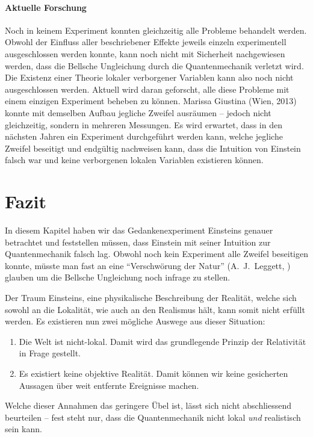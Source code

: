 \begin{refsection}
\paragraph{Aktuelle Forschung}
Noch in keinem Experiment konnten gleichzeitig alle Probleme behandelt werden.
Obwohl der Einfluss aller beschriebener Effekte jeweils einzeln experimentell
ausgeschlossen werden konnte, kann noch nicht mit Sicherheit nachgewiesen
werden, dass die Bellsche Ungleichung durch die Quantenmechanik verletzt wird.
Die Existenz einer Theorie lokaler verborgener Variablen kann also noch nicht
ausgeschlossen werden. 
Aktuell wird daran geforscht, alle diese Probleme mit einem einzigen Experiment
beheben zu k\"onnen. 
Marissa Giustina (Wien, 2013) \cite{Bell:Giustina2013} konnte mit demselben 
Aufbau jegliche Zweifel ausr\"aumen -- jedoch nicht gleichzeitig, sondern in 
mehreren Messungen.
Es wird erwartet, dass in den n\"achsten Jahren ein Experiment durchgef\"uhrt
werden kann, welche jegliche Zweifel beseitigt und endg\"ultig nachweisen
kann, dass die Intuition von Einstein falsch war und keine verborgenen
lokalen Variablen existieren k\"onnen.

\section{Fazit}
In diesem Kapitel haben wir das Gedankenexperiment Einsteins genauer betrachtet
und feststellen m\"ussen, dass Einstein mit seiner Intuition zur Quantenmechanik
falsch lag.
Obwohl noch kein Experiment alle Zweifel beseitigen konnte, m\"usste man fast
an eine 
\enquote{Verschw\"orung der Natur} (A.~J.~Leggett, \cite{Bell:Leggett2003})
glauben um die Bellsche Ungleichung noch infrage zu stellen.

Der Traum Einsteins, eine physikalische Beschreibung der Realit\"at, welche sich
sowohl an die Lokalit\"at, wie auch an den Realismus h\"alt, kann somit nicht 
erf\"ullt werden.
Es existieren nun zwei m\"ogliche Auswege aus dieser Situation:
\begin{enumerate}[label=(\roman*)]
    \item Die Welt ist nicht-lokal. Damit wird das grundlegende Prinzip der
        Relativit\"at in Frage gestellt.
    \item Es existiert keine objektive Realit\"at. Damit k\"onnen wir keine
        gesicherten Aussagen \"uber weit entfernte Ereignisse machen.
\end{enumerate}
Welche dieser Annahmen das geringere \"Ubel ist, l\"asst sich nicht
abschliessend beurteilen -- fest steht nur, dass die Quantenmechanik
nicht lokal \emph{und} realistisch sein kann.

\printbibliography[heading=subbibliography]
\end{refsection}

